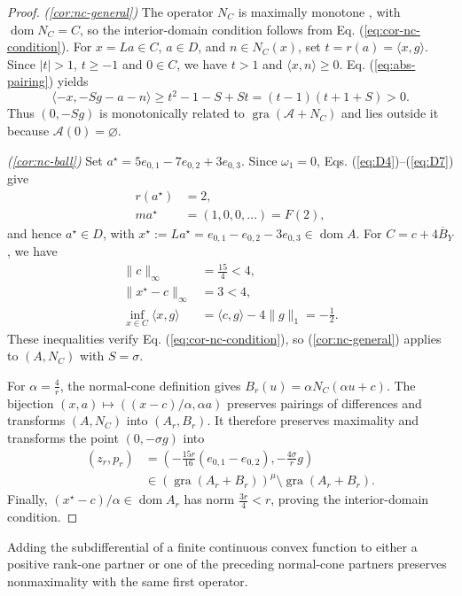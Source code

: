 \documentclass[11pt]{article}
\newcommand{\gra}{\operatorname{gra}}
\newcommand{\dom}{\operatorname{dom}}
\newcommand{\pair}[2]{\langle #1,#2\rangle}
\theoremstyle{definition}
\theoremstyle{remark}
\begin{document}
\begin{proof}
\noindent\textit{\textup{(\ref{cor:nc-general})}}
The operator $N_C$ is maximally monotone \cite{rockafellar1970subdiff}, with $\dom N_C=C$, so the interior-domain condition follows from Eq. (\ref{eq:cor-nc-condition}). For $x=La\in C$, $a\in D$, and $n\in N_C(x)$, set $t=r(a)=\pair{x}{g}$. Since $|t|>1$, $t\ge-1$ and $0\in C$, we have $t>1$ and $\pair{x}{n}\ge0$. Eq. (\ref{eq:abs-pairing}) yields
\[
\pair{-x}{-Sg-a-n}
\ge t^2-1-S+St
=(t-1)(t+1+S)>0.
\]
Thus $(0,-Sg)$ is monotonically related to $\gra(\mathcal A+N_C)$ and lies outside it because $\mathcal A(0)=\varnothing$.

\noindent\textit{\textup{(\ref{cor:nc-ball})}}
Set $a^\star=5e_{0,1}-7e_{0,2}+3e_{0,3}$. Since $\omega_1=0$, Eqs. (\ref{eq:D4})--(\ref{eq:D7}) give
\[
\begin{aligned}
r(a^\star)&=2,\\
ma^\star&=(1,0,0,\ldots)=F(2),
\end{aligned}
\]
and hence $a^\star\in D$, with $x^\star:=La^\star=e_{0,1}-e_{0,2}-3e_{0,3}\in\dom A$. For $C=c+4\overline B_Y$, we have
\[
\begin{aligned}
\|c\|_\infty&=\frac{15}{4}<4,\\
\|x^\star-c\|_\infty&=3<4,\\
\inf_{x\in C}\pair{x}{g}&=\pair{c}{g}-4\|g\|_1=-\frac12.
\end{aligned}
\]
These inequalities verify Eq. (\ref{eq:cor-nc-condition}), so \textup{(\ref{cor:nc-general})} applies to $(A,N_C)$ with $S=\sigma$.

For $\alpha=\frac4r$, the normal-cone definition gives $B_r(u)=\alpha N_C(\alpha u+c)$. The bijection $(x,a)\mapsto((x-c)/\alpha,\alpha a)$ preserves pairings of differences and transforms $(A,N_C)$ into $(A_r,B_r)$. It therefore preserves maximality and transforms the point $(0,-\sigma g)$ into
\begin{equation}
\begin{aligned}
(z_r,p_r)&=\left(-\frac{15r}{16}(e_{0,1}-e_{0,2}),-\frac{4\sigma}{r}g\right)\\
&\in(\gra(A_r+B_r))^\mu\setminus\gra(A_r+B_r).
\end{aligned}
\label{eq:cor-ball-witness}
\end{equation}
Finally, $(x^\star-c)/\alpha\in\dom A_r$ has norm $\frac{3r}{4}<r$, proving the interior-domain condition.
\end{proof}

Adding the subdifferential of a finite continuous convex function to either a positive rank-one partner or one of the preceding normal-cone partners preserves nonmaximality with the same first operator.
\end{document}

